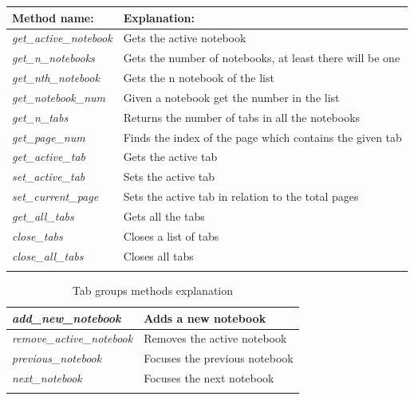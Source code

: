 \begin{table}[H]
  \begin{center}
    \begin{tabularx}{\textwidth}{|l|X|}
      \firsthline
      \textbf{Method name:} & \textbf{Explanation:} \\
      \hline
      \textit{get\_active\_notebook} & Gets the active notebook \\
      \hline
      \textit{get\_n\_notebooks} & Gets the number of notebooks, at least there will be one \\
      \hline
      \textit{get\_nth\_notebook} & Gets the n notebook of the list \\
      \hline
      \textit{get\_notebook\_num} & Given a notebook get the number in the list \\
      \hline
      \textit{get\_n\_tabs} & Returns the number of tabs in all the notebooks \\
      \hline
      \textit{get\_page\_num} & Finds the index of the page which contains the given tab \\
      \hline
      \textit{get\_active\_tab} & Gets the active tab \\
      \hline
      \textit{set\_active\_tab} & Sets the active tab \\
      \textit{set\_current\_page} & Sets the active tab in relation to the total pages \\
      \hline
      \textit{get\_all\_tabs} & Gets all the tabs \\
      \hline
      \textit{close\_tabs} & Closes a list of tabs \\
      \hline
      \textit{close\_all\_tabs} & Closes all tabs \\
      \lasthline
    \end{tabularx}
  \end{center}
\end{table}

\newpage
\begin{table}[H]
  \begin{center}
    \begin{tabularx}{\textwidth}{|l|X|}
      \firsthline
      \textit{add\_new\_notebook} & Adds a new notebook \\
      \hline
      \textit{remove\_active\_notebook} & Removes the active notebook \\
      \hline
      \textit{previous\_notebook} & Focuses the previous notebook \\
      \hline
      \textit{next\_notebook} & Focuses the next notebook \\
      \lasthline
    \end{tabularx}
    \caption{Tab groups methods explanation}
  \end{center}
\end{table}

